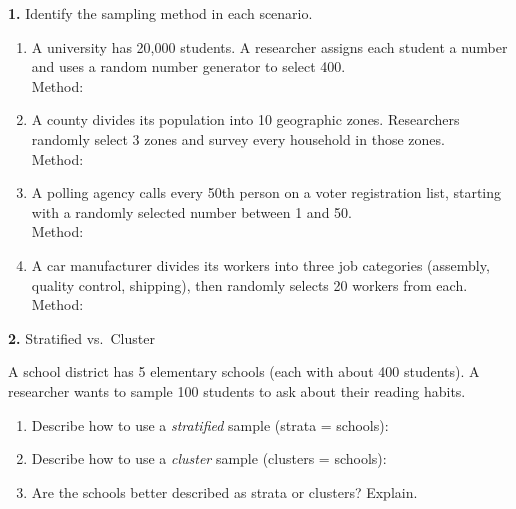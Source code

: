 \documentclass[10pt]{article}
\begin{document}
\namedateperiod

\vspace{0.1in}

\begin{practicebox}
\small
\textbf{1.} Identify the sampling method in each scenario.

\vspace{6pt}
\begin{enumerate}[leftmargin=1.5em, itemsep=10pt]
  \item A university has 20{,}000 students. A researcher assigns each student a
        number and uses a random number generator to select 400.\\
        Method: \blank{7cm}

  \item A county divides its population into 10 geographic zones. Researchers
        randomly select 3 zones and survey every household in those zones.\\
        Method: \blank{7cm}

  \item A polling agency calls every 50th person on a voter registration list,
        starting with a randomly selected number between 1 and 50.\\
        Method: \blank{7cm}

  \item A car manufacturer divides its workers into three job categories (assembly,
        quality control, shipping), then randomly selects 20 workers from each.\\
        Method: \blank{7cm}
\end{enumerate}
\end{practicebox}

\vspace{0.1in}

\begin{practicebox}
\small
\textbf{2.} Stratified vs.\ Cluster

A school district has 5 elementary schools (each with about 400 students).
A researcher wants to sample 100 students to ask about their reading habits.

\begin{enumerate}[leftmargin=1.5em, itemsep=8pt]
  \item Describe how to use a \emph{stratified} sample (strata = schools):
        \writeline\\[1pt]\writeline
  \item Describe how to use a \emph{cluster} sample (clusters = schools):
        \writeline\\[1pt]\writeline
  \item Are the schools better described as strata or clusters? Explain.
        \writeline\\[1pt]\writeline
\end{enumerate}
\end{practicebox}
\end{document}
